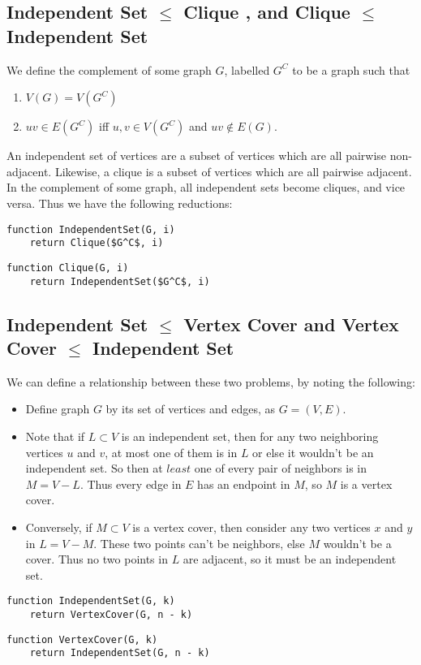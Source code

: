 \documentclass[12pt]{article}
\providecommand{\reducible}[2]{
  \textbf{#1} $\leq$ \textbf{#2}
}
\begin{document}
\subsection{\reducible{Independent Set}{Clique}, and \reducible{Clique}{Independent Set}}
We define the complement of some graph $G$, labelled $G^C$ to be a graph such that
\begin{enumerate}
  \item $V(G) = V(G^C)$
  \item $uv \in E(G^C)$ iff $u,v \in V(G^C)$ and $uv \not\in E(G)$.
\end{enumerate}
An independent set of vertices are a subset of vertices which are all pairwise non-adjacent.
Likewise, a clique is a subset of vertices which are all pairwise adjacent.
In the complement of some graph, all independent sets become cliques, and vice versa.
Thus we have the following reductions:
\begin{lstlisting}
function IndependentSet(G, i)
    return Clique($G^C$, i)
\end{lstlisting}
\begin{lstlisting}
function Clique(G, i)
    return IndependentSet($G^C$, i)
\end{lstlisting}


\subsection{\reducible{Independent Set}{Vertex Cover} and \reducible{Vertex Cover}{Independent Set}}
We can define a relationship between these two problems, by noting the following:
\begin{itemize}
  \item Define graph $G$ by its set of vertices and edges, as $G = (V,E)$.
  \item Note that if $L \subset V$ is an independent set, then for any two neighboring vertices $u$ and $v$, at most one of them is in $L$ or else it wouldn't be an independent set. So then at $least$ one of every pair of neighbors is in $M = V - L$. Thus every edge in $E$ has an endpoint in $M$, so $M$ is a vertex cover.
  \item Conversely, if $M \subset V$ is a vertex cover, then consider any two vertices $x$ and $y$ in $L = V - M$. These two points can't be neighbors, else $M$ wouldn't be a cover. Thus no two points in $L$ are adjacent, so it must be an independent set.
\end{itemize}
\begin{lstlisting}
function IndependentSet(G, k)
    return VertexCover(G, n - k)
\end{lstlisting}
\begin{lstlisting}
function VertexCover(G, k)
    return IndependentSet(G, n - k)
\end{lstlisting}
\end{document}
